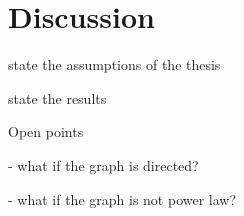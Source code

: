 \chapter{Discussion} %
\label{cha:discussion}


state the assumptions of the thesis

state the results

Open points

- what if the graph is directed?

- what if the graph is not power law?


